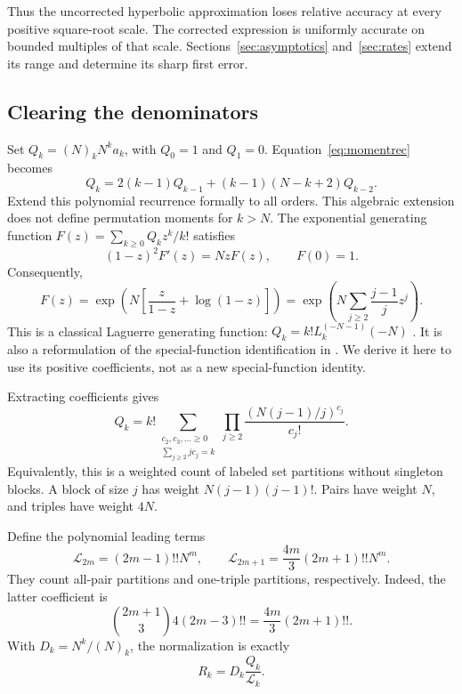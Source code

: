 \documentclass[11pt]{article}
\theoremstyle{definition}
\theoremstyle{remark}
\newcommand{\1}{\mathbf 1}
\begin{document}
Thus the uncorrected hyperbolic approximation loses relative accuracy at every positive square-root scale. The corrected expression is uniformly accurate on bounded multiples of that scale. Sections~\ref{sec:asymptotics} and~\ref{sec:rates} extend its range and determine its sharp first error.

\subsection{Clearing the denominators}

Set $Q_k=(N)_kN^ka_k$, with $Q_0=1$ and $Q_1=0$. Equation~\eqref{eq:momentrec} becomes
\begin{equation}\label{eq:qrec}
Q_k=2(k-1)Q_{k-1}+(k-1)(N-k+2)Q_{k-2}.
\end{equation}
Extend this polynomial recurrence formally to all orders. This algebraic extension does not define permutation moments for $k>N$. The exponential generating function $F(z)=\sum_{k\ge0}Q_kz^k/k!$ satisfies
\[
(1-z)^2F'(z)=NzF(z),\qquad F(0)=1.
\]
Consequently,
\begin{equation}\label{eq:egf}
F(z)=\exp\left(N\left[\frac z{1-z}+\log(1-z)\right]\right)
=\exp\left(N\sum_{j\ge2}\frac{j-1}{j}z^j\right).
\end{equation}
This is a classical Laguerre generating function: $Q_k=k!L_k^{(-N-1)}(-N)$ \cite[equations 18.5.12 and 18.12.13]{DLMF}. It is also a reformulation of the special-function identification in \cite[Remark 3.5]{CN}. We derive it here to use its positive coefficients, not as a new special-function identity.

Extracting coefficients gives
\begin{equation}\label{eq:partitions}
Q_k=k!\sum_{\substack{c_2,c_3,\ldots\ge0\\\sum_{j\ge2}jc_j=k}}
\prod_{j\ge2}\frac{(N(j-1)/j)^{c_j}}{c_j!}.
\end{equation}
Equivalently, this is a weighted count of labeled set partitions without singleton blocks. A block of size $j$ has weight $N(j-1)(j-1)!$. Pairs have weight $N$, and triples have weight $4N$.

Define the polynomial leading terms
\[
\mathcal L_{2m}=(2m-1)!!N^m,\qquad
\mathcal L_{2m+1}=\frac{4m}{3}(2m+1)!!N^m.
\]
They count all-pair partitions and one-triple partitions, respectively. Indeed, the latter coefficient is
\[
\binom{2m+1}{3}4(2m-3)!!=\frac{4m}{3}(2m+1)!!.
\]
With $D_k=N^k/(N)_k$, the normalization is exactly
\begin{equation}\label{eq:qnormalize}
R_k=D_k\frac{Q_k}{\mathcal L_k}.
\end{equation}
\end{document}
